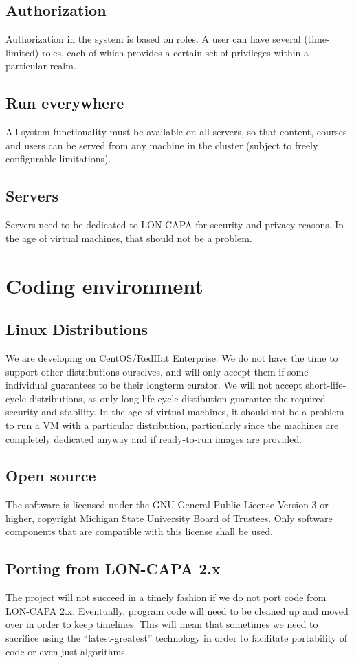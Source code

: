 \subsection{Authorization}
Authorization in the system is based on roles. A user can have several (time-limited) roles, each of which provides a certain set of privileges within a particular realm.
\subsection{Run everywhere}
All system functionality must be available on all servers, so that content, courses and users can be served from any machine in the cluster (subject to freely configurable limitations).
\subsection{Servers}
Servers need to be dedicated to LON-CAPA for security and privacy reasons. In the age of virtual machines, that should not be a problem.
\section{Coding environment}
\subsection{Linux Distributions}
We are developing on CentOS/RedHat Enterprise. We do not have the time to support other distributions ourselves, and will only accept them if some individual guarantees to be their longterm curator. We will not accept short-life-cycle distributions, as only long-life-cycle distibution guarantee the required security and stability. In the age of virtual machines, it should not be a problem to run a VM with a particular distribution, particularly since the machines are completely dedicated anyway and if ready-to-run images are provided.
\subsection{Open source}
The software is licensed under the GNU General Public License Version 3 or higher, copyright Michigan State University Board of Trustees. Only software components that are compatible with this license shall be used.
\subsection{Porting from LON-CAPA 2.x}
The project will not succeed in a timely fashion if we do not port code from LON-CAPA 2.x. Eventually, program code will need to be cleaned up and moved over in order to keep timelines. This will mean that sometimes we need to sacrifice using the ``latest-greatest'' technology in order to facilitate portability of code or even just algorithms. 
